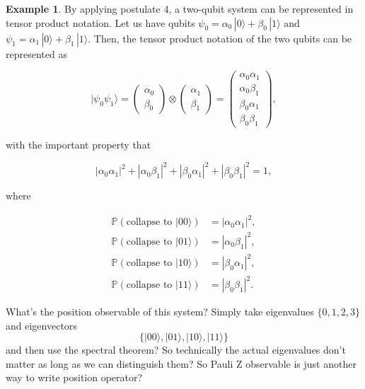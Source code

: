 \documentclass{article}
\newenvironment{question}{\color{blue}}{\ignorespacesafterend}
\theoremstyle{definition}
\newtheorem{example}{Example}[section]
\begin{document}
    \begin{example}
      By applying postulate 4, a two-qubit system can be represented in tensor product notation. Let us have qubits $\psi_0 = \alpha_0 \, |0\rangle + \beta_0 \, |1\rangle$ and $\psi_1 = \alpha_1 \, |0\rangle + \beta_1 \, |1\rangle$. Then, the tensor product notation of the two qubits can be represented as

        \[|\psi_0 \psi_1 \rangle = \begin{pmatrix} \alpha_0 \\ \beta_0 \end{pmatrix} \otimes \begin{pmatrix} \alpha_1 \\ \beta_1 \end{pmatrix} = \begin{pmatrix} \alpha_0 \alpha_1 \\ \alpha_0 \beta_1 \\ \beta_0 \alpha_1 \\ \beta_0 \beta_1 \end{pmatrix},\]

      with the important property that

        \[|\alpha_0 \alpha_1|^2 + |\alpha_0 \beta_1|^2 + |\beta_0 \alpha_1|^2 + |\beta_0 \beta_1|^2 = 1,\]

      where

      \begin{align*}
        \mathbb{P}(\text{collapse to } |00\rangle) & = |\alpha_0 \alpha_1|^2, \\
        \mathbb{P}(\text{collapse to } |01\rangle) & = |\alpha_0 \beta_1|^2, \\
        \mathbb{P}(\text{collapse to } |10\rangle) & = |\beta_0 \alpha_1|^2, \\
        \mathbb{P}(\text{collapse to } |11\rangle) & = |\beta_0 \beta_1|^2.
      \end{align*}

      \begin{question} 
        What's the position observable of this system? Simply take eigenvalues $\{0, 1, 2, 3\}$ and eigenvectors 
        \begin{equation} 
          \{ |00\rangle, |01\rangle, |10\rangle, |11\rangle\}
        \end{equation}
        and then use the spectral theorem? So technically the actual eigenvalues don't matter as long as we can distinguish them? So Pauli Z observable is just another way to write position operator? 
      \end{question}


\end{example}
\end{document}
